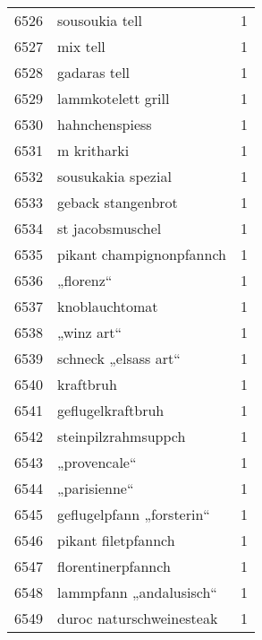 \begin{tabular}{llr}
6526 &                                     sousoukia tell &      1 \\
6527 &                                           mix tell &      1 \\
6528 &                                       gadaras tell &      1 \\
6529 &                                 lammkotelett grill &      1 \\
6530 &                                     hahnchenspiess &      1 \\
6531 &                                        m kritharki &      1 \\
6532 &                                 sousukakia spezial &      1 \\
6533 &                                 geback stangenbrot &      1 \\
6534 &                                   st jacobsmuschel &      1 \\
6535 &                           pikant champignonpfannch &      1 \\
6536 &                                          „florenz“ &      1 \\
6537 &                                     knoblauchtomat &      1 \\
6538 &                                         „winz art“ &      1 \\
6539 &                               schneck „elsass art“ &      1 \\
6540 &                                          kraftbruh &      1 \\
6541 &                                  geflugelkraftbruh &      1 \\
6542 &                                steinpilzrahmsuppch &      1 \\
6543 &                                       „provencale“ &      1 \\
6544 &                                       „parisienne“ &      1 \\
6545 &                          geflugelpfann „forsterin“ &      1 \\
6546 &                                pikant filetpfannch &      1 \\
6547 &                                 florentinerpfannch &      1 \\
6548 &                            lammpfann „andalusisch“ &      1 \\
6549 &                           duroc naturschweinesteak &      1 \\

\end{tabular}
